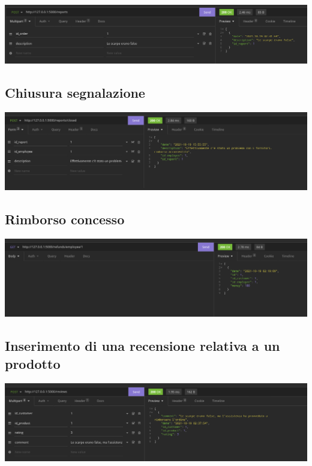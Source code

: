 \includegraphics[scale=0.33]{images/inserimento_segnalazione.png}

\subsection{Chiusura segnalazione}

\includegraphics[scale=0.33]{images/chiusura_segnalazione.png}

\subsection{Rimborso concesso}

\includegraphics[scale=0.33]{images/rimborso.png}

\subsection{Inserimento di una recensione relativa a un prodotto}

\includegraphics[scale=0.33]{images/recensione.png}

